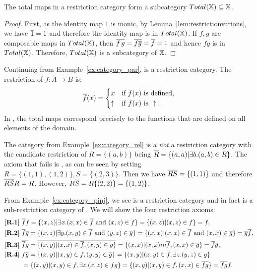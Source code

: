 \begin{lemma}\label{lem:total_maps_form_sub_category}
   The total maps in a restriction category form a subcategory  $Total(\mathbb{X}) \subseteq \mathbb{X}$.
\end{lemma}
\begin{proof}
  First, as the identity map $1$ is monic, by Lemma~\ref{lem:restrictionvarious}, we have $\overline{1} =
  1$ and therefore the identity map is in $Total(\mathbb{X})$. If $f,g$ are composable maps in $Total(\mathbb{X})$,
  then $\overline{f\,g} = \overline{f\overline{g}} = \overline{f} = 1$ and hence $f g$ is in $Total(\mathbb{X})$. Therefore,
  $Total(\mathbb{X})$ is a subcategory of $\mathbb{X}$.
\end{proof}
\begin{example}[\Par]\label{ex:par_is_a_restriction_category}
Continuing from Example~\ref{ex:category_par}, \Par is a restriction category. The restriction of $f:A\to B$ is:
\[
  \overline{f}(x) =
  \begin{cases}
    x&\text{if $f(x)$ is defined,}\\
    \uparrow&\text{if }f(x)\text{ is }\uparrow.
  \end{cases}
\]
In \Par, the
total maps correspond precisely to the functions that are defined on all elements of the domain.
\end{example}

\begin{example}[\rel]\label{ex:rel_is_not_a_restriction_category}
The category \rel from Example~\ref{ex:category_rel} is a \emph{not} a restriction category with the
candidate restriction of $R=\{(a,b)\}$ being $\overline{R} = \{(a,a) | \exists b. (a,b) \in R\}$. The
axiom that fails is \rfour, as can be seen by setting $R=\{(1,1),(1,2)\}, S=\{(2,3)\}$. Then we
have $\overline{RS} = \{(1,1)\}$ and therefore $\overline{RS} R = R$. However, $R\overline{S} = R\{(2,2)\} = \{(1,2)\}$.
\end{example}

\begin{example}[\pinj]\label{ex:pinj_is_a_restriction_category}
From Example~\ref{ex:category_pinj}, we see \pinj is a restriction category and in fact is a
sub-restriction category of \Par. We will show the four restriction axioms:
\begin{align*}
  \rone\ & \rst{f}f = \{(x,z) | \exists x. (x,x) \in \rst{f} \text{ and } (x,z) \in f\} = \{(x,z) |
  (x,z) \in f\} = f,\\
  \rtwo\ & \rst{f}\rst{g} = \{(x,z) | \exists y. (x,y) \in \rst{f} \text{ and } (y,z) \in \rst{g}\} =
  \{(x,x) | (x,x) \in \rst{f} \text{ and } (x,x) \in \rst{g}\} = \rst{g}\rst{f},\\
  \rthree\ & \rst{\rst{f} g} = \rst{\{(x,y) | (x,x) \in \rst{f}, (x,y) \in g\}} = \{(x,x) | (x,x) in
  \rst{f}, (x,x) \in \rst{g} \} = \rst{f} \rst{g},\\
  \rfour\ & f \rst{g} = \{(x,y) | (x,y) \in f, (y,y) \in \rst{g}\} =  \{(x,y) | (x,y) \in f, \exists
  z. (y,z) \in g\} \\
  &=  \{(x,y) | (x,y) \in f, \exists z. (x,z) \in f g\} =  \{(x,y) | (x,y) \in f,
  (x,x) \in \rst{f g}\} = \rst{f g} f.
\end{align*}
\end{example}


